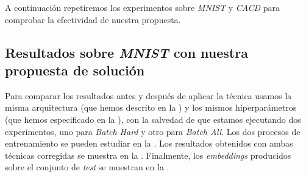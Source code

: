 A continuación repetiremos los experimentos sobre \textit{MNIST} y \textit{CACD} para comprobar la efectividad de nuestra propuesta.

\subsection{Resultados sobre \textit{MNIST} con nuestra propuesta de solución} \label{isubsec:experimentacion_mnist_bien}

Para comparar los resultados antes y después de aplicar la técnica usamos la misma arquitectura (que hemos descrito en la ) y los mismos hiperparámetros (que hemos especificado en la ), con la salvedad de que estamos ejecutando dos experimentos, uno para \textit{Batch Hard} y otro para \textit{Batch All}. Los dos procesos de entrenamiento se pueden estudiar en la . Los resultados obtenidos con ambas técnicas corregidas se muestra en la . Finalmente, los \textit{embeddings} producidos sobre el conjunto de \textit{test} se muestran en la .

